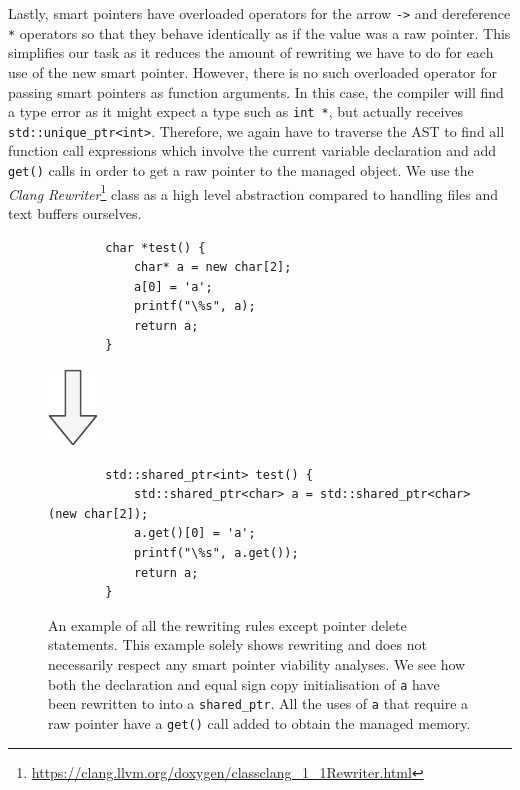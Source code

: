 \documentclass{mpaper}
\begin{document}
    Lastly, smart pointers have overloaded operators for the arrow \texttt{->} and dereference \texttt{*} operators so that they behave identically as if the value was a raw pointer.
    This simplifies our task as it reduces the amount of rewriting we have to do for each use of the new smart pointer.
    However, there is no such overloaded operator for passing smart pointers as function arguments. 
    In this case, the compiler will find a type error as it might expect a type such as \texttt{int *}, but actually receives \texttt{std::unique_ptr<int>}. 
    Therefore, we again have to traverse the AST to find all function call expressions which involve the current variable declaration and add \texttt{get()} calls in order to get a raw pointer to the managed object.
    We use the \emph{Clang Rewriter}\footnote{\url{https://clang.llvm.org/doxygen/classclang_1_1Rewriter.html}} class as a high level abstraction compared to handling files and text buffers ourselves.
    
    \begin{figure}
        \centering
        \begin{verbatim}
        char *test() {
            char* a = new char[2];
            a[0] = 'a';
            printf("\%s", a);
            return a;
        }
        \end{verbatim}
        
        \includegraphics{images/arrow.pdf}
        
        \begin{verbatim}
        std::shared_ptr<int> test() {
            std::shared_ptr<char> a = std::shared_ptr<char>(new char[2]);
            a.get()[0] = 'a';
            printf("\%s", a.get());
            return a;
        }
        \end{verbatim}
        
        \caption{An example of all the rewriting rules except pointer delete statements. This example solely shows rewriting and does not necessarily respect any smart pointer viability analyses. We see how both the declaration and equal sign copy initialisation of \texttt{a} have been rewritten to into a \texttt{shared\_ptr}. All the uses of \texttt{a}  that require a raw pointer have a \texttt{get()} call added to obtain the managed memory.}
        \label{fig:rewriting}
    \end{figure}
    
\end{document}
